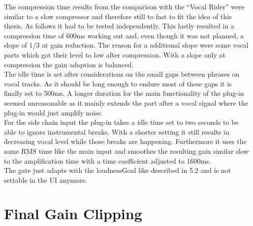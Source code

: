 The compression time results from the comparison with the “Vocal Rider” were similar to a slow compressor and therefore still to fast to fit the idea of this thesis. As follows it had to be tested independently. This lastly resulted in a compression time of 600ms working out and, even though it was not planned, a slope of 1/3 at gain reduction. The reason for a additional slope were some vocal parts which got their level to low after compression. With a slope only at compression the gain adaption is balanced.\\
The idle time is set after considerations on the small gaps between phrases on vocal tracks. As it should be long enough to endure most of these gaps it is finally set to 500ms. A longer duration for the main functionality of the plug-in seemed unreasonable as it mainly extends the part after a vocal signal where the plug-in would just amplify noise.\\
For the side chain input the plug-in takes a idle time set to two seconds to be able to ignore instrumental breaks. With a shorter setting it still results in decreasing vocal level while those breaks are happening. Furthermore it uses the same RMS time like the main input and smoothes the resulting gain similar slow to the amplification time with a time coefficient adjusted to 1600ms.\\
The gate just adapts with the loudnessGoal like described in 5.2 and is not settable in the UI anymore.\\

\section{Final Gain Clipping}

